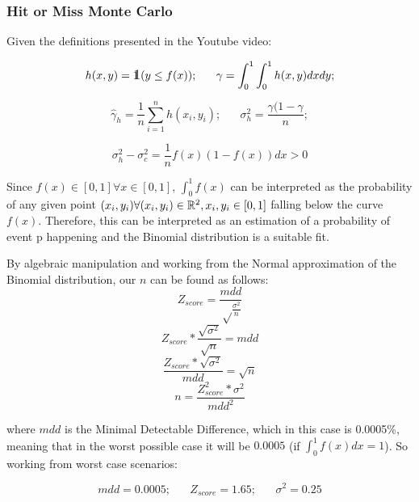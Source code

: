 \documentclass{homework}
\def\one{\mbox{1\hspace{-4.25pt}\fontsize{12}{14.4}\selectfont\textrm{1}}} %
\begin{document}
\subsubsection{Hit or Miss Monte Carlo}

Given the definitions presented in the Youtube video:

\begin{equation}
    h(x, y) = \one(y \leq f(x)); \;\;\;\;\;\; \gamma = \int_0^1 \int_0^1 h(x, y)dxdy;
\end{equation}

\begin{equation}
    \hat \gamma_h = \frac{1}{n}\sum_{i = 1}^n h(x_i, y_i); \;\;\;\;\;\; \sigma_h^2 = \frac{\gamma(1 - \gamma}{n};
\end{equation}


\begin{equation}
    \sigma_h^2 - \sigma_c^2 = \frac{1}{n}f(x)(1 - f(x))dx > 0
\end{equation}

Since $f(x) \in [0, 1] \forall x \in [0, 1]$, $\int_0^1 f(x)$ can be interpreted as the probability of any given point $(x_i, y_i) \forall (x_i, y_i) \in \mathbb R^2, x_i, y_i \in [0, 1]$ falling below the curve $f(x)$. Therefore, this can be interpreted as an estimation of a probability of event p happening and the Binomial distribution is a suitable fit.

By algebraic manipulation and working from the Normal approximation of the Binomial distribution, our $n$ can be found as follows:
\begin{equation}
Z_{score} = \frac{mdd}{\sqrt\frac{\sigma^2}{n}}
\end{equation}
\begin{equation}
Z_{score}*\frac{\sqrt{\sigma^2}}{\sqrt{n}} = mdd
\end{equation}
\begin{equation}
\frac{Z_{score}*\sqrt{\sigma^2}}{mdd} =\sqrt{n}
\end{equation}
\begin{equation}
n = \frac{Z_{score}^2 * \sigma^2}{mdd^2}
\end{equation}

where $mdd$ is the Minimal Detectable Difference, which in this case is 0.0005\%, meaning that in the worst possible case it will be $0.0005$ (if $\int_0^1 f(x)dx = 1$). So working from worst case scenarios:


\begin{equation}
    mdd = 0.0005; \;\;\;\;\;\; Z_{score} = 1.65; \;\;\;\;\;\; \sigma^2 = 0.25
\end{equation}
\end{document}

